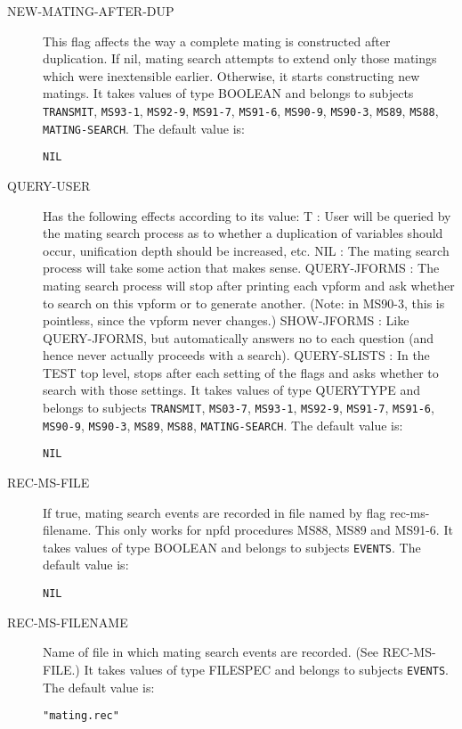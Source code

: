 \begin{description}
\item[NEW-MATING-AFTER-DUP]  
This flag affects the way a complete mating is constructed after
    duplication.  If nil, mating search attempts to extend only those matings
    which were inextensible earlier. Otherwise, it starts constructing new
    matings.
It takes values of type BOOLEAN and belongs to subjects \texttt{TRANSMIT}, \texttt{MS93-1}, \texttt{MS92-9}, \texttt{MS91-7}, \texttt{MS91-6}, \texttt{MS90-9}, \texttt{MS90-3}, \texttt{MS89}, \texttt{MS88}, \texttt{MATING-SEARCH}.  The default value is: \begin{lstlisting}
NIL
\end{lstlisting}

\item[QUERY-USER]  
Has the following effects according to its value:
T :  User will be queried by the mating search process as to whether 
  a duplication of variables should occur, unification
  depth should be increased, etc.
NIL :  The mating search process will take some action that makes sense.
QUERY-JFORMS : The mating search process will stop after printing each 
vpform and ask whether to search on this vpform or to generate another.
(Note: in MS90-3, this is pointless, since the vpform never changes.)
SHOW-JFORMS : Like QUERY-JFORMS, but automatically answers no to each 
question (and hence never actually proceeds with a search).
QUERY-SLISTS : In the TEST top level, stops after each setting of the
flags and asks whether to search with those settings.
It takes values of type QUERYTYPE and belongs to subjects \texttt{TRANSMIT}, \texttt{MS03-7}, \texttt{MS93-1}, \texttt{MS92-9}, \texttt{MS91-7}, \texttt{MS91-6}, \texttt{MS90-9}, \texttt{MS90-3}, \texttt{MS89}, \texttt{MS88}, \texttt{MATING-SEARCH}.  The default value is: \begin{lstlisting}
NIL
\end{lstlisting}

\item[REC-MS-FILE]  
If true, mating search events are recorded in file named by flag
rec-ms-filename. This only works for npfd procedures MS88, MS89 and MS91-6.
It takes values of type BOOLEAN and belongs to subjects \texttt{EVENTS}.  The default value is: \begin{lstlisting}
NIL
\end{lstlisting}

\item[REC-MS-FILENAME]  
Name of file in which mating search events are recorded. (See
REC-MS-FILE.)
It takes values of type FILESPEC and belongs to subjects \texttt{EVENTS}.  The default value is: \begin{lstlisting}
"mating.rec"
\end{lstlisting}


\end{description}
